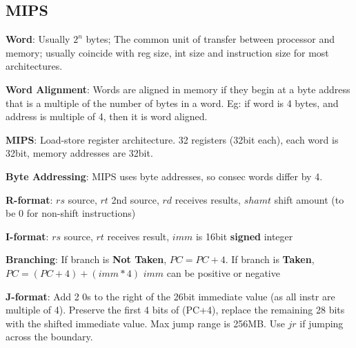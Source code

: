 \documentclass[a4paper,landscape]{article}
\newcommand{\rntopic}[1]{\vspace{-2.0em}\subsection*{#1}\vspace{-1.0em}}
\newcommand{\rnname}[1]{\textbf{#1}}
\begin{document}
\begin{multicols*}{4}
\begin{flatitemize}
\end{flatitemize}

\rntopic{MIPS}

\begin{flatitemize}
\item \rnname{Word}: Usually $2^n$ bytes; The common unit of transfer between processor and memory; usually coincide with reg size, int size and instruction size for most architectures. 
\item \rnname{Word Alignment}: Words are aligned in memory if they begin at a byte address that is a multiple of the number of bytes in a word. Eg: if word is 4 bytes, and address is multiple of 4, then it is word aligned.
\item \rnname{MIPS}: Load-store register architecture. 32 registers (32bit each), each word is 32bit, memory addresses are 32bit.
\item \rnname{Byte Addressing}: MIPS uses byte addresses, so consec words differ by 4.
\item \rnname{R-format}: $rs$ source, $rt$ 2nd source, $rd$ receives results, $shamt$ shift amount (to be 0 for non-shift instructions)
\item \rnname{I-format}: $rs$ source, $rt$ receives result, $imm$ is 16bit \textbf{signed} integer
\item \rnname{Branching}: If branch is \textbf{Not Taken}, $PC = PC+4$. If branch is \textbf{Taken}, $PC = (PC + 4) + (imm*4)$ $imm$ can be positive or negative
\item \rnname{J-format}: Add 2 0s to the right of the 26bit immediate value (as all instr are multiple of 4). Preserve the first 4 bits of (PC+4), replace the remaining 28 bits with the shifted immediate value. Max jump range is 256MB. Use $jr$ if jumping across the boundary.
\end{flatitemize}



\end{multicols*}
\end{document}
